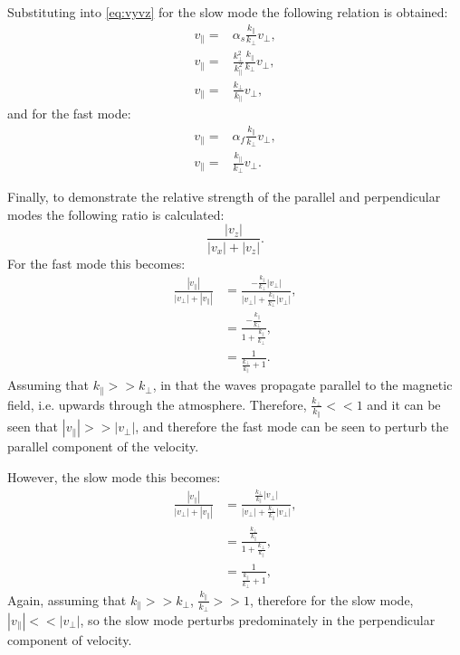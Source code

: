 Substituting into \cref{eq:vyvz} for the slow mode the following relation is obtained:
\begin{align}
    v_\parallel =& \alpha_s \frac{k_\parallel}{k_\perp}v_\perp,\\
    v_\parallel =& \frac{k^2_\perp}{k^2_\parallel}\frac{k_\parallel}{k_\perp}v_\perp,\\
    v_\parallel =& \frac{k_\perp}{k_\parallel}v_\perp,
\end{align}
and for the fast mode:
\begin{align}
    v_\parallel =& \alpha_f \frac{k_\parallel}{k_\perp}v_\perp,\\
    v_\parallel =& \frac{k_\parallel}{k_\perp}v_\perp.
\end{align}

Finally, to demonstrate the relative strength of the parallel and perpendicular modes the following ratio is calculated:
\begin{equation}
    \frac{|v_z|}{|v_x|+|v_z|}.
\end{equation}
For the fast mode this becomes:
\begin{align}
\frac{|v_\parallel|}{|v_\perp|+|v_\parallel|} &= \frac{-\frac{k_\parallel}{k_\perp}|v_\perp|}{|v_\perp|+\frac{k_\parallel}{k_\perp}|v_\perp|},\\
&= \frac{-\frac{k_\parallel}{k_\perp}}{1+\frac{k_\parallel}{k_\perp}},\\
&= \frac{1}{\frac{k_\perp}{k_\parallel}+1}.
\end{align}
Assuming that $k_\parallel >> k_\perp$, in that the waves propagate parallel to the magnetic field, i.e. upwards through the atmosphere.
Therefore, $\displaystyle \frac{k_\perp}{k_\parallel} << 1$ and it can be seen that $|v_\parallel| >> |v_\perp|$, and therefore the fast mode can be seen to perturb the parallel component of the velocity.

However, the slow mode this becomes:
\begin{align}
    \frac{|v_\parallel|}{|v_\perp|+|v_\parallel|} &= \frac{\frac{k_\perp}{k_\parallel}|v_\perp|}{|v_\perp|+\frac{k_\perp}{k_\parallel}|v_\perp|},\\
    &= \frac{\frac{k_\perp}{k_\parallel}}{1+\frac{k_\perp}{k_\parallel}},\\
    &= \frac{1}{\frac{k_\parallel}{k_\perp} + 1},
\end{align}
Again, assuming that $k_\parallel >> k_\perp$, $\displaystyle \frac{k_\parallel}{k_\perp} >> 1$, therefore for the slow mode, $|v_\parallel| << |v_\perp|$, so the slow mode perturbs predominately in the perpendicular component of velocity.  


